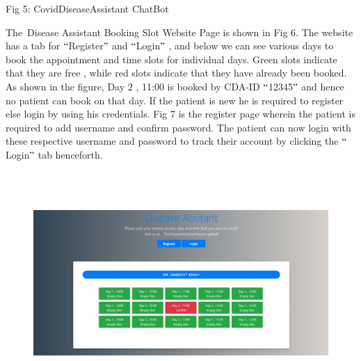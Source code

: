 \documentclass[12pt]{article}
\begin{document}


\vspace{\baselineskip}\begin{Center}
Fig 5: CovidDiseaseAssistant ChatBot
\end{Center}

\setlength{\parskip}{9.96pt}
\setlength{\parskip}{12.0pt}
\begin{justify}
The\ Disease Assistant Booking Slot Website Page is shown in Fig 6. The website has a tab for $``$Register$"$  and $``$Login$"$ , and below we can see various days to book the appointment and time slots for individual days. Green slots indicate that they are free , while red slots indicate that they have already been booked. As shown in the figure, Day 2 , 11:00 is booked by CDA-ID $``$12345$"$  and hence no patient can book on that day. If the patient is new he is  required to register else login by using his credentials. Fig 7 is the register page wherein the patient is required to add username and confirm password. The patient can now login with these respective username and password to track their account by clicking the $``$Login$"$  tab henceforth.
\end{justify}



\begin{figure}[H]
	\begin{Center}
		\includegraphics[width=6.52in,height=3.33in]{./media/image2.png}
	\end{Center}
\end{figure}


\end{document}
